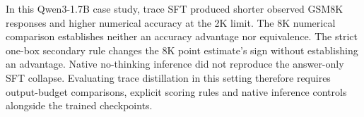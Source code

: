 In this Qwen3-1.7B case study, trace SFT produced shorter observed GSM8K responses and higher numerical accuracy at the 2K limit. The 8K numerical comparison establishes neither an accuracy advantage nor equivalence. The strict one-box secondary rule changes the 8K point estimate's sign without establishing an advantage. Native no-thinking inference did not reproduce the answer-only SFT collapse. Evaluating trace distillation in this setting therefore requires output-budget comparisons, explicit scoring rules and native inference controls alongside the trained checkpoints.

